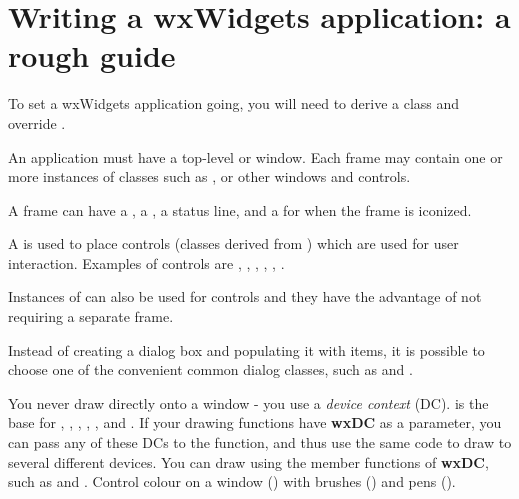 \section{Writing a wxWidgets application: a rough guide}\label{roughguide}

To set a wxWidgets application going, you will need to derive a  class and
override .

An application must have a top-level  or  window.
Each frame may contain one or more instances of classes such as , \rtfsp
or other windows and controls.

A frame can have a , a , a status line, and a  for
when the frame is iconized.

A  is used to place controls (classes derived from )
which are used for user interaction. Examples of controls are ,
\rtfsp{}, , ,
\rtfsp{}, .

Instances of  can also be used for controls and they have
the advantage of not requiring a separate frame.

Instead of creating a dialog box and populating it with items, it is possible to choose
one of the convenient common dialog classes, such as \rtfsp
and .

You never draw directly onto a window - you use a {\it device context} (DC).  is
the base for , , , ,
\rtfsp{},  and .
If your drawing functions have {\bf wxDC} as a parameter, you can pass any of these DCs
to the function, and thus use the same code to draw to several different devices.
You can draw using the member functions of {\bf wxDC}, such as \rtfsp
and . Control colour on a window () with
brushes () and pens ().

